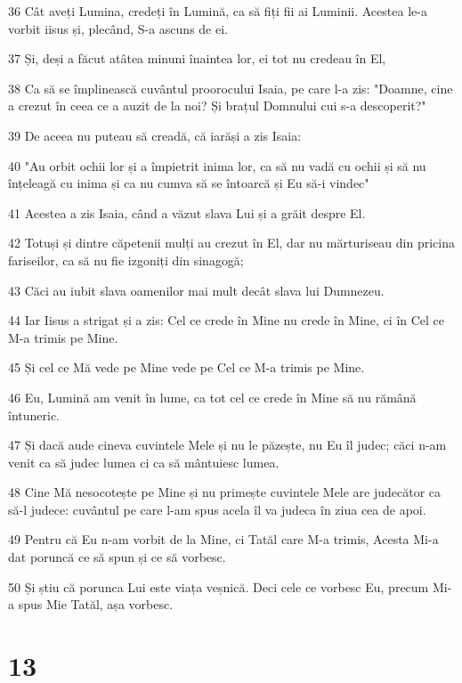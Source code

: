\par 36 Cât aveți Lumina, credeți în Lumină, ca să fiți fii ai Luminii. Acestea le-a vorbit iisus și, plecând, S-a ascuns de ei.
\par 37 Și, deși a făcut atâtea minuni înaintea lor, ei tot nu credeau în El,
\par 38 Ca să se împlinească cuvântul proorocului Isaia, pe care l-a zis: "Doamne, cine a crezut în ceea ce a auzit de la noi? Și brațul Domnului cui s-a descoperit?"
\par 39 De aceea nu puteau să creadă, că iarăși a zis Isaia:
\par 40 "Au orbit ochii lor și a împietrit inima lor, ca să nu vadă cu ochii și să nu înțeleagă cu inima și ca nu cumva să se întoarcă și Eu să-i vindec"
\par 41 Acestea a zis Isaia, când a văzut slava Lui și a grăit despre El.
\par 42 Totuși și dintre căpetenii mulți au crezut în El, dar nu mărturiseau din pricina fariseilor, ca să nu fie izgoniți din sinagogă;
\par 43 Căci au iubit slava oamenilor mai mult decât slava lui Dumnezeu.
\par 44 Iar Iisus a strigat și a zis: Cel ce crede în Mine nu crede în Mine, ci în Cel ce M-a trimis pe Mine.
\par 45 Și cel ce Mă vede pe Mine vede pe Cel ce M-a trimis pe Mine.
\par 46 Eu, Lumină am venit în lume, ca tot cel ce crede în Mine să nu rămână întuneric.
\par 47 Și dacă aude cineva cuvintele Mele și nu le păzește, nu Eu îl judec; căci n-am venit ca să judec lumea ci ca să mântuiesc lumea.
\par 48 Cine Mă nesocotește pe Mine și nu primește cuvintele Mele are judecător ca să-l judece: cuvântul pe care l-am spus acela îl va judeca în ziua cea de apoi.
\par 49 Pentru că Eu n-am vorbit de la Mine, ci Tatăl care M-a trimis, Acesta Mi-a dat poruncă ce să spun și ce să vorbesc.
\par 50 Și știu că porunca Lui este viața veșnică. Deci cele ce vorbesc Eu, precum Mi-a spus Mie Tatăl, așa vorbesc.

\chapter{13}

